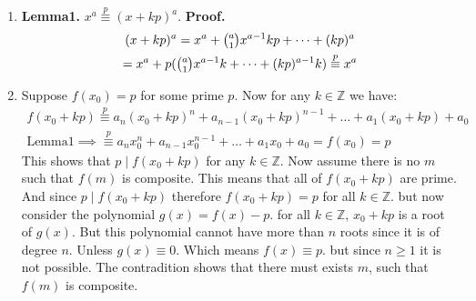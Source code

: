 \begin{enumerate}[label=]
    \item 
        \textbf{Lemma1.} $x^a \overset{p }{\equiv } (x + kp)^a$. \newline
        \textbf{Proof.} 
        \begin{gather*}
            (x + kp)^a = x^a + \tbinom{a }{1} x^{a - 1}kp + \dots + (kp)^a \\
            = x^a + p(\tbinom{a }{1 }x^{a -1}k + \dots + (kp)^{a - 1}k)
            \overset{p }{\equiv } x^a
        \end{gather*}
    \item  
        Suppose $f(x_0) = p$ for some prime $p$. Now for any $k \in \mathbb Z$ we have:
        \begin{gather*}
            f(x_0 + kp) \overset{p }{\equiv } a_n (x_0 + kp)^n + a_{n - 1} (x_0 + kp)^{n - 1} + \dots + a_1 (x_0 + kp) + a_0 \\
            \text{Lemma1} \implies \overset{p }{\equiv } a_n x_0^n + a_{n - 1} x_0^{n - 1} + \dots + a_1 x_0 + a_0 = f(x_0) = p
        \end{gather*}
        This shows that $p \mid f(x_0 + kp)$ for any $k \in \mathbb Z$.
        Now assume there is no $m$ such that $f(m)$ is composite. This means that all of $f(x_0 + kp)$ are prime. And since $p \mid f(x_0 + kp)$ therefore $f(x_0 + kp) = p$ for all $k \in \mathbb Z$. but now consider the polynomial $g(x) = f(x) - p$. for all $k \in \mathbb Z$, $x_0 + kp$ is a root of $g(x)$. But this polynomial cannot have more than $n$ roots since it is of degree $n$. Unless
        $g(x) \equiv 0$. Which means $f(x) \equiv p$. but since $n \ge 1$ it is not possible. The contradition shows that there must exists $m$, such that $f(m)$ is composite.
\end{enumerate}
